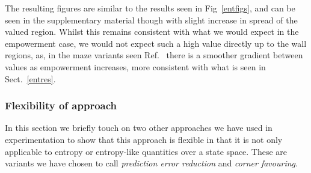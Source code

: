 \documentclass{article}
\begin{document}
The resulting figures are similar to the results seen in Fig~\ref{entfigs}, and can be seen in the supplementary material%
though with slight increase in spread of the valued region. Whilst this remains consistent with what we would expect in the empowerment case, we would not expect such a high value directly up to the wall regions, as, in the maze variants seen Ref.~\citep{klyubin2005empowerment} there is a smoother gradient between values as empowerment increases, more consistent with what is seen in Sect.~\ref{entres}. %

\subsubsection{Flexibility of approach}
In this section we briefly touch on two other approaches we have used in experimentation to show that this approach is flexible in that it is not only applicable to entropy or entropy-like quantities over a state space. These are variants we have chosen to call \emph{prediction error reduction} and \emph{corner favouring}.
\end{document}
